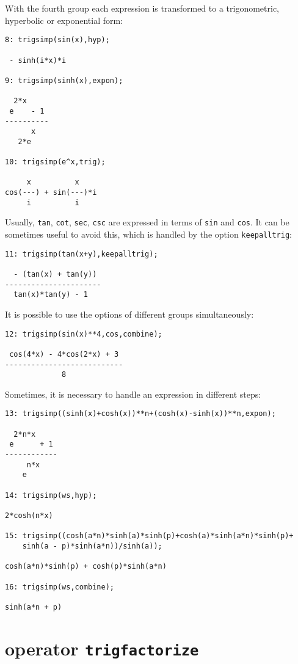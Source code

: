 With the fourth group each expression is transformed to a
trigonometric, hyperbolic or exponential form:
{\small
\begin{verbatim}
8: trigsimp(sin(x),hyp);

 - sinh(i*x)*i

9: trigsimp(sinh(x),expon);
        
  2*x
 e    - 1
----------
      x
   2*e

10: trigsimp(e^x,trig);

     x          x
cos(---) + sin(---)*i
     i          i
\end{verbatim}
}\noindent 

Usually, {\tt tan}, {\tt cot}, {\tt sec}, {\tt csc} are expressed in terms of
{\tt sin} and {\tt cos}. It can 
be sometimes useful to avoid this, which is handled by the option 
{\tt keepalltrig}:
{\small
\begin{verbatim}
11: trigsimp(tan(x+y),keepalltrig);

  - (tan(x) + tan(y))
----------------------
  tan(x)*tan(y) - 1
\end{verbatim}
}\noindent

It is possible to use the options of different groups simultaneously:
{\small
\begin{verbatim}
12: trigsimp(sin(x)**4,cos,combine);

 cos(4*x) - 4*cos(2*x) + 3
---------------------------
             8
\end{verbatim}
}\noindent

Sometimes, it is necessary to handle an expression in different steps:
{\small
\begin{verbatim}
13: trigsimp((sinh(x)+cosh(x))**n+(cosh(x)-sinh(x))**n,expon);

  2*n*x
 e      + 1
------------
     n*x
    e 
 
14: trigsimp(ws,hyp);

2*cosh(n*x)

15: trigsimp((cosh(a*n)*sinh(a)*sinh(p)+cosh(a)*sinh(a*n)*sinh(p)+ 
    sinh(a - p)*sinh(a*n))/sinh(a));

cosh(a*n)*sinh(p) + cosh(p)*sinh(a*n)

16: trigsimp(ws,combine);

sinh(a*n + p)
\end{verbatim}
}\noindent

\section{\REDUCE{} operator {\tt trigfactorize}}

